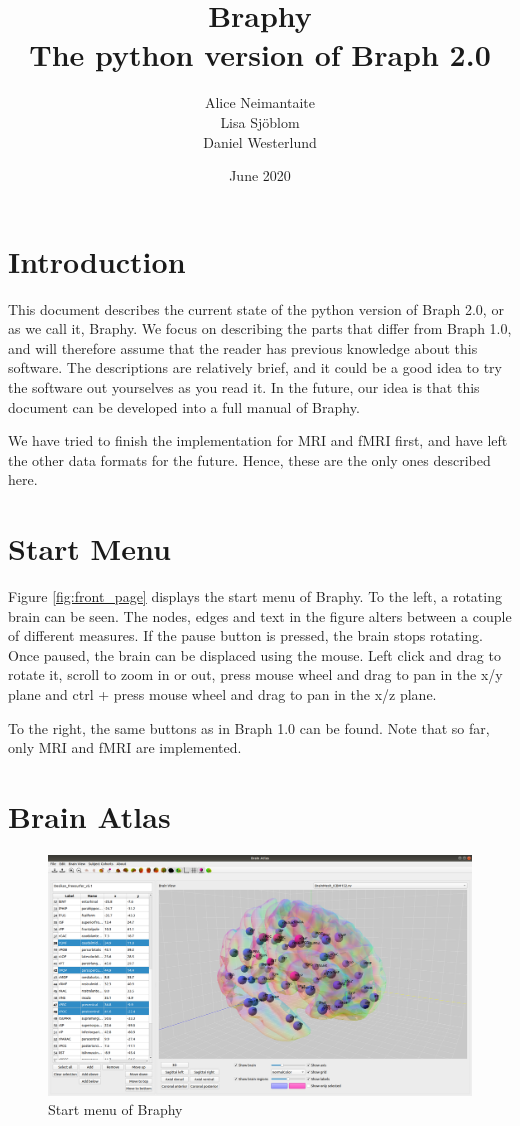 \documentclass{article}
\title{%
	Braphy \\
	\large The python version of Braph 2.0}
\author{Alice Neimantaite \\ Lisa Sjöblom \\ Daniel Westerlund}
\date{June 2020}
\begin{document}
\maketitle
\clearpage

\section{Introduction}

This document describes the current state of the python version of Braph 2.0, or as we call it, Braphy. We focus on describing the parts that differ from Braph 1.0, and will therefore assume that the reader has previous knowledge about this software. The descriptions are relatively brief, and it could be a good idea to try the software out yourselves as you read it. In the future, our idea is that this document can be developed into a full manual of Braphy.

We have tried to finish the implementation for MRI and fMRI first, and have left the other data formats for the future. Hence, these are the only ones described here.

\section{Start Menu}

Figure \ref{fig:front_page} displays the start menu of Braphy. To the left, a rotating brain can be seen. The nodes, edges and text in the figure alters between a couple of different measures. If the pause button is pressed, the brain stops rotating. Once paused, the brain can be displaced using the mouse. Left click and drag to rotate it, scroll to zoom in or out, press mouse wheel and drag to pan in the x/y plane and ctrl + press mouse wheel and drag to pan in the x/z plane.

To the right, the same buttons as in Braph 1.0 can be found. Note that so far, only MRI and fMRI are implemented. 

\section{Brain Atlas}

\begin{figure}[h]
    \centering
    \includegraphics[width=\linewidth]{brain_atlas.png}
    \caption{Start menu of Braphy}
    \label{fig:brain_atlas}
\end{figure}
\end{document}
